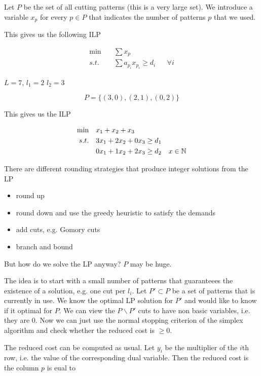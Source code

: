 Let $P$ be the set of all cutting patterns (this is a very large set). We introduce a variable $x_p$ for every $p\in P$ that indicates the number of patterns $p$ that we used.

This gives us the following ILP

\begin{align*}
\min \quad & \sum x_p\\
s.t. \quad & \sum a_{p_i}x_{p_i} \geq d_i && \forall i
\end{align*}

\begin{Ex} $L=7$, $l_1=2$ $l_2=3$

\[P=\{(3,0),(2,1),(0,2)\}\]

This gives us the ILP

\begin{align*}
\min \quad & x_1+x_2+x_3\\
s.t.\quad & 3x_1+2x_2+0x_3 \geq d_1\\
	&0x_1 + 1x_2+ 2x_3 \geq d_2
	&x\in \mathbb{N}
\end{align*}
\end{Ex}

There are different rounding strategies that produce integer solutions from the LP

\begin{itemize}
\item round up
\item round down and use the greedy heuristic to satisfy the demands
\item add cuts, e.g. Gomory cuts
\item branch and bound
\end{itemize}

But how do we solve the LP anyway? $P$ may be huge.

The idea is to start with a small number of patterns that guaranteees the existence of a solution, e.g. one cut per $l_i$. Let $P'\subset P$ be a set of patterns that is currently in use. We know the optimal LP solution for $P'$ and would like to know if it optimal for $P$. We can view the $P\backslash P'$ cuts to have non basic variables, i.e. they are 0. Now we can just use the normal stopping criterion of the simplex algorithm and check whether the reduced cost is $\geq 0$.

The reduced cost can be computed as usual. Let $y_i$ be the multiplier of the $i$th row, i.e. the value of the corresponding dual variable. Then the reduced cost is the column $p$ is eual to

